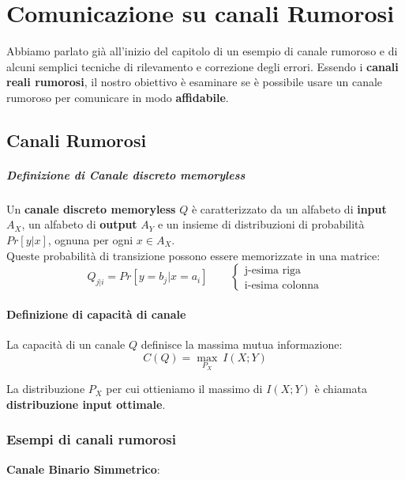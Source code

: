 \chapter{Comunicazione su canali Rumorosi}
Abbiamo parlato già all'inizio del capitolo di un esempio di canale rumoroso e di alcuni semplici tecniche di rilevamento e correzione degli errori. Essendo i \textbf{canali reali rumorosi}, il nostro obiettivo è esaminare se è possibile usare un canale rumoroso per comunicare in modo \textbf{affidabile}.

\section{Canali Rumorosi}
\paragraph{Definizione di Canale discreto memoryless}
Un \textbf{canale discreto memoryless} $Q$ è caratterizzato da un alfabeto di \textbf{input} $A_X$, un alfabeto di \textbf{output} $A_Y$ e un insieme di distribuzioni di probabilità $Pr[y|x]$, ognuna per ogni $x\in A_X$.\\
Queste probabilità di transizione possono essere memorizzate in una matrice:
\begin{equation}
	Q_{j|i} = Pr[y = b_j | x = a_i] \qquad 
	\begin{cases}
		\text{j-esima riga} \\
		\text{i-esima colonna}
	\end{cases}
\end{equation}

\subsubsection{Definizione di capacità di canale}
La capacità di un canale $Q$ definisce la massima mutua informazione:
\begin{equation}
	C(Q) = \max_{P_X}\ I(X;Y)
\end{equation}

La distribuzione $P_X$ per cui ottieniamo il massimo di $I(X;Y)$ è chiamata \textbf{distribuzione input ottimale}.


\subsection{Esempi di canali rumorosi}
\textbf{Canale Binario Simmetrico}:

